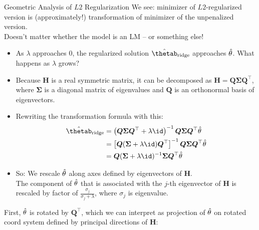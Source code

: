 \documentclass[11pt,compress,t,notes=noshow, xcolor=table]{beamer}
\begin{document}
\begin{vbframe}{Geometric Analysis of $L2$ Regularization}
We see: minimizer of $L2$-regularized version is (approximately!) transformation of minimizer of the unpenalized version.\\
Doesn't matter whether the model is an LM -- or something else!
\vspace{0.2cm}



\framebreak

  \begin{itemize}
    \item As $\lambda$ approaches $0$, the regularized solution $\hat{\thetab}_{\text{ridge}}$ approaches $\hat{\theta}$. What happens as $\lambda$ grows?
    \item Because $\bm{H}$ is a real symmetric matrix, it can be decomposed as $\bm{H} = \bm{Q} \bm{\Sigma} \bm{Q}^\top$, where $\bm{\Sigma}$ is a diagonal matrix of eigenvalues and $\bm{Q}$ is an orthonormal basis of eigenvectors.
    \item Rewriting the transformation formula with this:
  \begin{equation*}
    \begin{aligned} 
    \hat{\thetab}_{\text{ridge}} &=\left(\bm{Q} \bm{\Sigma} \bm{Q}^{\top}+\lambda \id\right)^{-1} \bm{Q} \bm{\Sigma} \bm{Q}^{\top} \thetah \\ 
              &=\left[\bm{Q}(\bm{\Sigma}+\lambda \id) \bm{Q}^{\top}\right]^{-1} \bm{Q} \bm{\Sigma} \bm{Q}^{\top} \thetah \\ 
              &=\bm{Q}(\bm{\Sigma} + \lambda \id)^{-1} \bm{\Sigma} \bm{Q}^{\top} \thetah 
    \end{aligned}
  \end{equation*}
    \item So: We rescale $\hat{\theta}$ along axes defined by eigenvectors of $\bm{H}$. \\
    The component of $\hat{\theta}$ that is associated with the $j$-th eigenvector of $\bm{H}$ is rescaled by factor of $\frac{\sigma_j}{\sigma_j + \lambda}$, where $\sigma_j$ is eigenvalue.
\end{itemize}

\framebreak

First, $\hat{\theta}$ is rotated by $\bm{Q}^{\top}$, which we can interpret as projection of $\hat{\theta}$ on rotated coord system defined by principal directions of $\bm{H}$:


\end{vbframe}
\end{document}
